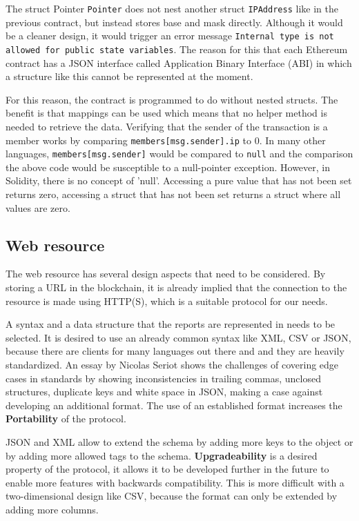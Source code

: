 The struct Pointer \texttt{Pointer} does not nest another struct \texttt{IPAddress} like in the previous contract, but instead stores base and mask directly. Although it would be a cleaner design, it would trigger an error message \texttt{Internal type is not allowed for public state variables}. The reason for this that each Ethereum contract has a JSON interface called Application Binary Interface (ABI) in which a structure like this cannot be represented at the moment. 

For this reason, the contract is programmed to do without nested structs. The benefit is that mappings can be used which means that no helper method is needed to retrieve the data.
Verifying that the sender of the transaction is a member works by comparing \texttt{members[msg.sender].ip} to 0. In many other languages, \texttt{members[msg.sender]} would be compared to \texttt{null} and the comparison the above code would be susceptible to a null-pointer exception. However, in Solidity, there is no concept of 'null'. Accessing a pure value that has not been set returns zero, accessing a struct that has not been set returns a struct where all values are zero.

\subsection{Web resource}
The web resource has several design aspects that need to be considered. By storing a URL in the blockchain, it is already implied that the connection to the resource is made using HTTP(S), which is a suitable protocol for our needs.

A syntax and a data structure that the reports are represented in needs to be selected. It is desired to use an already common syntax like XML, CSV or JSON, because there are clients for many languages out there and and they are heavily standardized. An essay by Nicolas Seriot \cite{ParsingJSON} shows the challenges of covering edge cases in standards by showing inconsistencies in trailing commas, unclosed structures, duplicate keys and white space in JSON, making a case against developing an additional format. The use of an established format increases the \textbf{Portability} of the protocol.

JSON and XML allow to extend the schema by adding more keys to the object or by adding more allowed tags to the schema. \textbf{Upgradeability} is a desired property of the protocol, it allows it to be developed further in the future to enable more features with backwards compatibility. This is more difficult with a two-dimensional design like CSV, because the format can only be extended by adding more columns.


